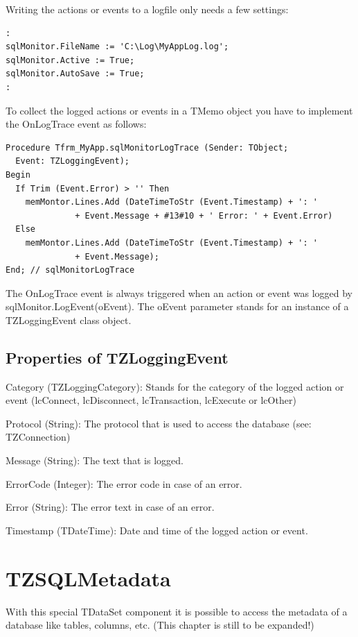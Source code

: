 \documentclass[a4paper,12pt,oneside]{book}
\begin{document}
Writing the actions or events to a logfile only needs a few settings:

\begin{verbatim}
:
sqlMonitor.FileName := 'C:\Log\MyAppLog.log';
sqlMonitor.Active := True;
sqlMonitor.AutoSave := True;
:
\end{verbatim}

To collect the logged actions or events in a TMemo object you have to implement the OnLogTrace event as
follows:

\begin{verbatim}
Procedure Tfrm_MyApp.sqlMonitorLogTrace (Sender: TObject; 
  Event: TZLoggingEvent);
Begin
  If Trim (Event.Error) > '' Then
    memMontor.Lines.Add (DateTimeToStr (Event.Timestamp) + ': ' 
		      + Event.Message + #13#10 + ' Error: ' + Event.Error)
  Else
    memMontor.Lines.Add (DateTimeToStr (Event.Timestamp) + ': ' 
		      + Event.Message);
End; // sqlMonitorLogTrace
\end{verbatim}

The OnLogTrace event is always triggered when an action or event was logged by sqlMonitor.LogEvent(oEvent).
The oEvent parameter stands for an instance of a TZLoggingEvent class object.

\subsection{Properties of TZLoggingEvent}
Category (TZLoggingCategory): Stands for the category of the logged action or event (lcConnect,
lcDisconnect, lcTransaction, lcExecute or lcOther)

Protocol (String): The protocol that is used to access the database (see: TZConnection)

Message (String): The text that is logged.

ErrorCode (Integer): The error code in case of an error.

Error (String): The error text in case of an error.

Timestamp (TDateTime): Date and time of the logged action or event.

\section{TZSQLMetadata}
With this special TDataSet component it is possible to access the metadata of a database like tables, columns, etc.
(This chapter is still to be expanded!)
\end{document}
